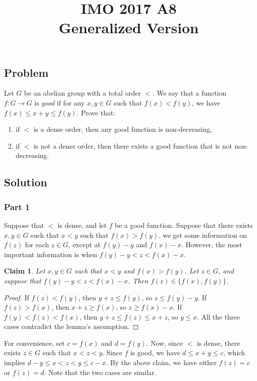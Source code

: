 \documentclass{article}
\title{IMO 2017 A8 \\ Generalized Version}
\author{}
\date{}
\newtheorem*{claim}{Claim}
\begin{document}
\maketitle



\subsection*{Problem}

Let $G$ be an abelian group with a total order $<$.
We say that a function $f : G \to G$ is \emph{good} if for any $x, y \in G$ such that $f(x) < f(y)$, we have $f(x) \leq x + y \leq f(y)$.
Prove that:
\begin{enumerate}
    \item if $<$ is a dense order, then any good function is non-decreasing,
    \item if $<$ is not a dense order, then there exists a good function that is not non-decreasing.
\end{enumerate}


\subsection*{Solution}

\subsubsection*{Part 1}

Suppose that $<$ is dense, and let $f$ be a good function.
Suppose that there exists $x, y \in G$ such that $x < y$ such that $f(x) > f(y)$.
we get some information on $f(z)$ for each $z \in G$, except at $f(y) - y$ and $f(x) - x$.
However, the most important information is when $f(y) - y < z < f(x) - x$.

\begin{claim}
Let $x, y \in G$ such that $x < y$ and $f(x) > f(y)$.
Let $z \in G$, and suppose that $f(y) - y < z < f(x) - x$.
Then $f(z) \in \{f(x), f(y)\}$.
\end{claim}
\begin{proof}
If $f(z) < f(y)$, then $y + z \leq f(y)$, so $z \leq f(y) - y$.
If $f(z) > f(x)$, then $x + z \geq f(x)$, so $z \geq f(x) - x$.
If $f(y) < f(z) < f(x)$, then $y + z \leq f(z) \leq x + z$, so $y \leq x$.
All the three cases contradict the lemma's assumption.
\end{proof}

For convenience, set $c = f(x)$ and $d = f(y)$.
Now, since $<$ is dense, there exists $z \in G$ such that $x < z < y$.
Since $f$ is good, we have $d \leq x + y \leq c$, which implies $d - y \leq x < z < y \leq c - x$.
By the above claim, we have either $f(z) = c$ or $f(z) = d$.
Note that the two cases are similar.
\end{document}
